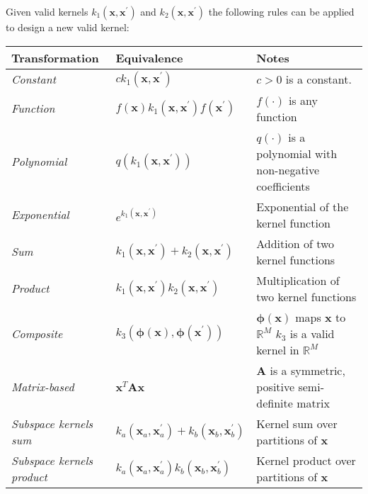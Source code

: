 Given valid kernels $k_1(\mathbf{x},\mathbf{x}^\prime)$ and $k_2(\mathbf{x},\mathbf{x}^\prime)$ the following rules can be applied to design a new valid kernel:
\renewcommand*{\arraystretch}{2}
\begin{table}[H]
    \centering
    \begin{tabular}{|l|l|l|}
        \hline
        \textbf{Transformation} & \textbf{Equivalence} & \textbf{Notes} \\
        \hline
        \textit{Constant} & $c k_1(\mathbf{x}, \mathbf{x}^\prime)$ & $c > 0$ is a constant. \\
        \hline
        \textit{Function} & $f(\mathbf{x}) k_1(\mathbf{x}, \mathbf{x}^\prime) f(\mathbf{x}^\prime)$ & $f(\cdot)$ is any function \\
        \hline
        \textit{Polynomial} & $q(k_1(\mathbf{x}, \mathbf{x}^\prime))$ & \makecell[l]{$q(\cdot)$ is a polynomial with \\ non-negative coefficients} \\
        \hline
        \textit{Exponential} & $e^{k_1(\mathbf{x}, \mathbf{x}^\prime)}$ & Exponential of the kernel function \\
        \hline
        \textit{Sum} & $k_1(\mathbf{x}, \mathbf{x}^\prime) + k_2(\mathbf{x}, \mathbf{x}^\prime)$ & Addition of two kernel functions \\
        \hline
        \textit{Product} & $k_1(\mathbf{x}, \mathbf{x}^\prime) k_2(\mathbf{x}, \mathbf{x}^\prime)$ & Multiplication of two kernel functions \\
        \hline
        \textit{Composite} & $k_3(\boldsymbol{\phi}(\mathbf{x}), \boldsymbol{\phi}(\mathbf{x}^\prime))$ & \makecell[l]{$\boldsymbol{\phi}(\mathbf{x})$ maps $\mathbf{x}$ to $\mathbb{R}^M$ \\ $k_3$ is a valid kernel in $\mathbb{R}^M$} \\
        \hline
        \textit{Matrix-based} & $\mathbf{x}^T \mathbf{A} \mathbf{x}$ & \makecell[l]{$\mathbf{A}$ is a symmetric, \\ positive semi-definite matrix} \\
        \hline
        \textit{Subspace kernels sum} & $k_a(\mathbf{x}_a, \mathbf{x}_a^\prime) + k_b(\mathbf{x}_b, \mathbf{x}_b^\prime)$ & Kernel sum over partitions of $\mathbf{x}$ \\
        \hline
        \textit{Subspace kernels product} & $k_a(\mathbf{x}_a, \mathbf{x}_a^\prime) k_b(\mathbf{x}_b, \mathbf{x}_b^\prime)$ & Kernel product over partitions of $\mathbf{x}$ \\
        \hline
    \end{tabular}
\end{table}
\renewcommand*{\arraystretch}{1}

